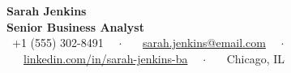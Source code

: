 \documentclass[10pt]{article}
\begin{document}
\begin{center}
  {\Huge\bfseries\color{primary} Sarah Jenkins} \\[0.4em]
  {\large\bfseries\color{accent} Senior Business Analyst} \\
  \vspace{0.5em}
  {\color{secondary}\small
    \faPhone\ +1 (555) 302-8491 \ \ $\cdot$ \ \
    \faEnvelope\ \href{mailto:sarah.jenkins@email.com}{sarah.jenkins@email.com} \ \ $\cdot$ \ \
    \faLinkedin\ \href{https://linkedin.com/in/sarah-jenkins-ba}{linkedin.com/in/sarah-jenkins-ba} \ \ $\cdot$ \ \
    \faMapMarker\ Chicago, IL
  }
\end{center}

\vspace{0.5em}

\end{document}
